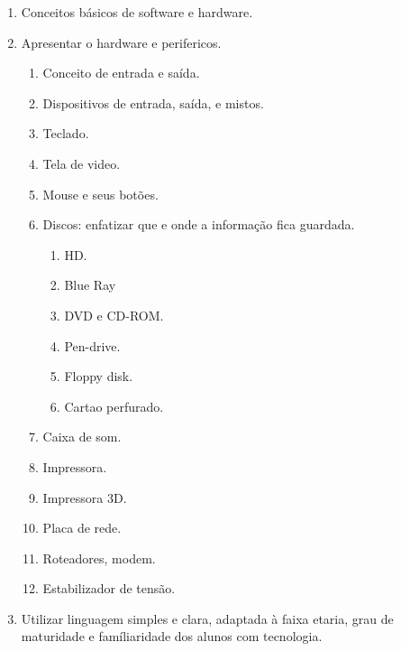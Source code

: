 \begin{enumerate}
	\item Conceitos básicos de software e hardware.
	\item Apresentar o hardware e perifericos.
	\begin{enumerate}
		\item Conceito de entrada e saída.
		\item Dispositivos de entrada, saída, e mistos.
		\item Teclado.
		\item Tela de video.
		\item Mouse e seus botões.
		\item Discos: enfatizar que e onde a informação fica guardada.
		\begin{enumerate}
			\item HD.
			\item Blue Ray
			\item DVD e CD-ROM.
			\item Pen-drive.
			\item Floppy disk.
			\item Cartao perfurado.
		\end{enumerate}
		\item Caixa de som.
		\item Impressora.
		\item Impressora 3D.
		\item Placa de rede.
		\item Roteadores, modem.
		\item Estabilizador de tensão.
	\end{enumerate}
	\item Utilizar linguagem simples e clara, adaptada à faixa etaria, grau de maturidade e famíliaridade dos alunos com tecnologia.
\end{enumerate}